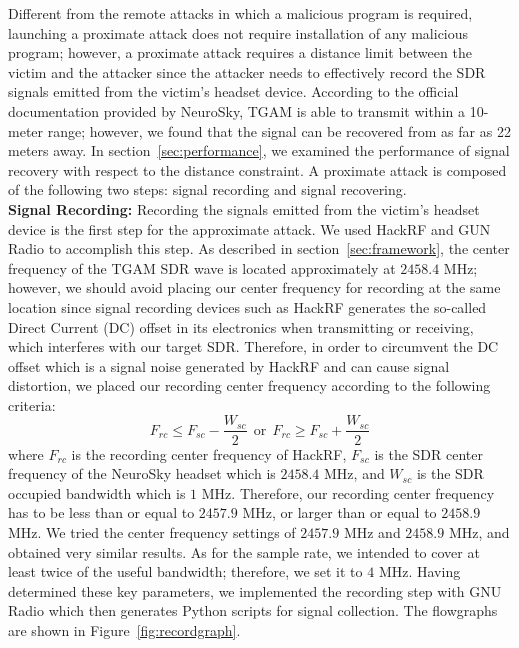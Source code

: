 Different from the remote attacks in which a malicious program is required, launching a proximate attack does not require installation of any malicious program; however, a proximate attack requires a distance limit between the victim and the attacker since the attacker needs to effectively record the SDR signals emitted from the victim's headset device. According to the official documentation provided by NeuroSky, TGAM is able to transmit within a 10-meter range; however, we found that the signal can be recovered from as far as 22 meters away. In section~\ref{sec:performance}, we examined the performance of signal recovery with respect to the distance constraint. A proximate attack is composed of the following two steps: signal recording and signal recovering.\\
%
\indent \textbf{Signal Recording:} Recording the signals emitted from the victim's headset device is the first step for the approximate attack. We used HackRF and GUN Radio to accomplish this step. As described in section~\ref{sec:framework}, the center frequency of the TGAM SDR wave is located approximately at $2458.4$ MHz; however, we should avoid placing our center frequency for recording at the same location since signal recording devices such as HackRF generates the so-called Direct Current (DC) offset in its electronics when transmitting or receiving, which interferes with our target SDR. Therefore, in order to circumvent the DC offset which is a signal noise generated by HackRF and can cause signal distortion, we placed our recording center frequency according to the following criteria:
\begin{equation}
F_{rc} \leq F_{sc} - \frac{W_{sc}}{2}\ \ \mbox{or}\ \ F_{rc} \geq F_{sc} + \frac{W_{sc}}{2}
\end{equation}
where $F_{rc}$ is the recording center frequency of HackRF, $F_{sc}$ is the SDR center frequency of the NeuroSky headset which is $2458.4$ MHz, and $W_{sc}$ is the SDR occupied bandwidth which is $1$ MHz. Therefore, our recording center frequency has to be less than or equal to $2457.9$ MHz, or larger than or equal to $2458.9$ MHz. We tried the center frequency settings of $2457.9$ MHz and $2458.9$ MHz, and obtained very similar results. As for the sample rate, we intended to cover at least twice of the useful bandwidth; therefore, we set it to $4$ MHz. Having determined these key parameters, we implemented the recording step with GNU Radio which then generates Python scripts for signal collection. The flowgraphs are shown in Figure~\ref{fig:recordgraph}.\\
